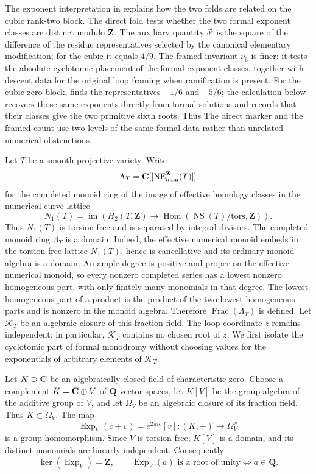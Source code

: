 The exponent interpretation in \cite[Section~2]{RuddM1} explains how the two
folds are related on the cubic rank-two block.  The direct fold tests whether
the two formal exponent classes are distinct modulo \(\mathbf Z\).  The auxiliary
quantity \(\delta^\sharp\) is the square of the difference of the residue
representatives selected by the canonical elementary modification; for the
cubic it equals \(4/9\).  The
framed invariant \(\nu_6\) is finer: it tests the absolute cyclotomic
placement of the formal exponent classes, together with descent data for the
original loop framing when ramification is present.  For the cubic zero
block, \cite[Section~2]{RuddM1} finds the representatives
\(-1/6\) and \(-5/6\); the calculation below
recovers those same exponents directly from formal solutions and records
that their classes give the two primitive sixth roots.  Thus
The direct marker and the framed count use two levels of the same formal data
rather than unrelated numerical obstructions.

Let \(T\) be a smooth projective variety.  Write
\[
 \Lambda_T=\mathbf C[[\operatorname{NE}^{\mathbf Z}_{\rm num}(T)]]
\]
for the completed monoid ring of the image of effective homology classes in
the numerical curve lattice
\[
 N_1(T)=\operatorname{im}\!\left(
 H_2(T,\mathbf Z)\longrightarrow
 \operatorname{Hom}(\operatorname{NS}(T)/\mathrm{tors},\mathbf Z)\right).
\]
Thus \(N_1(T)\) is torsion-free and is separated by integral divisors.  The
completed monoid ring \(\Lambda_T\) is a domain.  Indeed, the effective
numerical monoid embeds in the torsion-free lattice \(N_1(T)\), hence is
cancellative and its ordinary monoid algebra is a domain.  An ample degree
is positive and proper on the effective numerical monoid, so every nonzero
completed series has a lowest nonzero homogeneous part, with only finitely
many monomials in that degree.  The lowest homogeneous part of a product is
the product of the two lowest homogeneous parts and is nonzero in the monoid
algebra.  Therefore \(\operatorname{Frac}(\Lambda_T)\) is defined.  Let
\(\mathcal K_T\) be an algebraic closure of this fraction field.  The loop
coordinate \(z\) remains independent: in particular, \(\mathcal K_T\)
contains no chosen root of \(z\).  We first isolate the cyclotomic part of
formal monodromy without choosing values for the exponentials of arbitrary
elements of \(\mathcal K_T\).

Let \(K\supset\mathbf C\) be an algebraically closed field of characteristic zero.
Choose a complement \(K=\mathbf C\oplus V\) of \(\mathbf Q\)-vector spaces, let
\(K[V]\) be the group algebra of the additive group of \(V\), and let
\(\Omega_V\) be an algebraic closure of its fraction field.  Thus
\(K\subset\Omega_V\).  The map
\[
 \operatorname{Exp}_V(c+v)=e^{2\pi i c}[v]
 \colon (K,+)\longrightarrow\Omega_V^\times
 \label{eq:universal-exponential}
\]
is a group homomorphism.  Since \(V\) is torsion-free, \(K[V]\) is a domain,
and its distinct monomials are linearly independent.  Consequently
\[
 \ker(\operatorname{Exp}_V)=\mathbf Z,
 \qquad
 \operatorname{Exp}_V(a)\text{ is a root of unity}
 \Longleftrightarrow a\in\mathbf Q.
 \label{eq:universal-exponential-torsion}
\]

